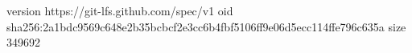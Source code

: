 version https://git-lfs.github.com/spec/v1
oid sha256:2a1bdc9569c648e2b35bcbcf2e3cc6b4fbf5106ff9e06d5ecc114ffe796c635a
size 349692
